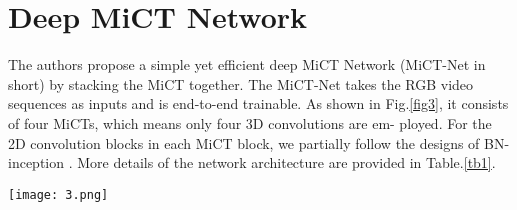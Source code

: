\documentclass[10pt,twocolumn,letterpaper]{article}
\begin{document}
\section{Deep MiCT Network}
The authors propose a simple yet efficient deep MiCT Network
(MiCT-Net in short) by stacking the MiCT together. The
MiCT-Net takes the RGB video sequences as inputs and is
end-to-end trainable. As shown in Fig.\ref{fig3}, it consists of four
MiCTs, which means only four 3D convolutions are em-
ployed. For the 2D convolution blocks in each MiCT block,
we partially follow the designs of BN-inception \cite{szegedy2016rethinking}. More
details of the network architecture are provided in Table.\ref{tb1}.
\begin{figure*}[ht]
	\centering
	\texttt{[image: 3.png]}
	\caption{Illustration of the proposed MiCT-Net. Green blocks refer to 3D convolution. Orange blocks and blue blocks refer to 2D
		convolutions for cross-domain residual connections and concatenated connections, respectively. Each mosaic-like box denotes an n-
		channel feature map at time t (n=192, 576, 1056 in MiCT Block-1/2/3, respectively). The architecture details of each Incept. block are
		shown in the top-right area of the figure.}
	\label{fig3}
\end{figure*}
\begin{table}
\caption{Architecture of MiCT-Net.}
\label{tb1}
\end{table}


\end{document}
